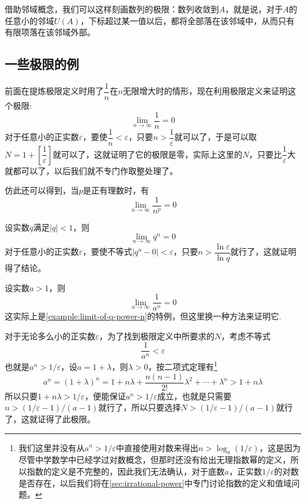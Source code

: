 借助邻域概念，我们可以这样刻画数列的极限：数列收敛到$A$，就是说，对于$A$的任意小的邻域$U(A)$，下标超过某一值以后，都将全部落在该邻域中，从而只有有限项落在该邻域外部。

\subsection{一些极限的例}
\label{sec:some-examples-about-limit-of-number-sequence}

\begin{example}
  \label{example:limit-of-1-devide-by-n-power-p}
  前面在提炼极限定义时用了$\dfrac{1}{n}$在$n$无限增大时的情形，现在利用极限定义来证明这个极限:
  \[ \lim_{n \to \infty} \frac{1}{n} = 0 \]
  对于任意小的正实数$\varepsilon$，要使$\dfrac{1}{n}<\varepsilon$，只要$n>\dfrac{1}{\varepsilon}$就可以了，于是可以取$N=1+\left[ \dfrac{1}{\varepsilon} \right]$就可以了，这就证明了它的极限是零，实际上这里的$N$，只要比$\dfrac{1}{\varepsilon}$大就都可以了，以后我们就不专门作取整处理了。

  仿此还可以得到，当$p$是正有理数时，有
  \[ \lim_{n \to \infty} \frac{1}{n^p} = 0 \]
\end{example}

\begin{example}
  \label{example:limit-of-q-power-n}
  设实数$q$满足$|q|<1$，则
  \[ \lim_{n \to \infty} q^n = 0 \]
  对于任意小的正实数$\varepsilon$，要使不等式$|q^n - 0| < \varepsilon$，只要$n>\dfrac{\ln{\varepsilon}}{\ln{q}}$就行了，这就证明得了结论。
\end{example}

\begin{example}
  \label{example:limit-of-1-devide-by-a-power-n}
  设实数$a>1$，则
  \[ \lim_{n \to \infty} \frac{1}{a^n} = 0 \]
  这实际上是\autoref{example:limit-of-q-power-n}的特例，但这里换一种方法来证明它.
  
  对于无论多么小的正实数$\varepsilon$，为了找到极限定义中所要求的$N$，考虑不等式
  \[ \frac{1}{a^n} < \varepsilon \]
  也就是$a^n>1/\varepsilon$，设$a=1+\lambda$，则$\lambda>0$，按二项式定理有\footnote{我们这里并没有从$a^n>1/\varepsilon$中直接使用对数来得出$n>\log_a{(1/\varepsilon)}$，这是因为尽管中学数学中已经学过对数概念，但那时还没有给出无理指数幂的定义，所以指数的定义是不完整的，因此我们无法确认，对于底数$a$，正实数$1/\varepsilon$的对数是否存在，以后我们将在\autoref{sec:irrational-power}中专门讨论指数的定义和值域问题。}
  \[ a^n = (1+\lambda)^n = 1 + n\lambda + \frac{n(n-1)}{2!}\lambda^2+\cdots+\lambda^n > 1+n \lambda \]
  所以只要$1+n\lambda>1/\varepsilon$，便能保证$a^n>1/\varepsilon$成立，也就是只需要$n > (1/\varepsilon-1) / (a-1)$就行了，所以只要选择$N>(1/\varepsilon-1)/(a-1)$就行了，这就证得了此极限。
\end{example}

